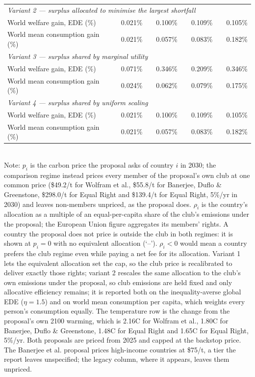 \begin{table}[htbp]
\begin{tabular}{lcccccccc}
  \midrule
  \multicolumn{9}{l}{\textit{Variant 2 --- surplus allocated to minimise the largest shortfall}} \\
  \quad World welfare gain, EDE (\%) &  & 0.021\% &  & 0.100\% &  & 0.109\% &  & 0.105\% \\
  \quad World mean consumption gain (\%) &  & 0.021\% &  & 0.057\% &  & 0.083\% &  & 0.182\% \\
  \midrule
  \multicolumn{9}{l}{\textit{Variant 3 --- surplus shared by marginal utility}} \\
  \quad World welfare gain, EDE (\%) &  & 0.071\% &  & 0.346\% &  & 0.209\% &  & 0.346\% \\
  \quad World mean consumption gain (\%) &  & 0.024\% &  & 0.062\% &  & 0.079\% &  & 0.175\% \\
  \midrule
  \multicolumn{9}{l}{\textit{Variant 4 --- surplus shared by uniform scaling}} \\
  \quad World welfare gain, EDE (\%) &  & 0.021\% &  & 0.100\% &  & 0.109\% &  & 0.105\% \\
  \quad World mean consumption gain (\%) &  & 0.021\% &  & 0.057\% &  & 0.083\% &  & 0.182\% \\
  \bottomrule
\end{tabular}
\label{tab:equiv_rights_A}
\\[4pt]
{\footnotesize Note: $p_i$ is the carbon price the proposal asks of country $i$ in 2030; the comparison regime instead prices every member of the proposal's own club at one common price (\$49.2/t for Wolfram et al., \$55.8/t for Banerjee, Duflo \& Greenstone, \$298.0/t for Equal Right and \$139.4/t for Equal Right, 5\%/yr in 2030) and leaves non-members unpriced, as the proposal does. $\rho_i$ is the country's allocation as a multiple of an equal-per-capita share of the club's emissions under the proposal; the European Union figure aggregates its members' rights. A country the proposal does not price is outside the club in both regimes: it is shown at $p_i=0$ with no equivalent allocation (`--'). $\rho_i < 0$ would mean a country prefers the club regime even while paying a net fee for its allocation. Variant 1 lets the equivalent allocation set the cap, so the club price is recalibrated to deliver exactly those rights; variant 2 rescales the same allocation to the club's own emissions under the proposal, so club emissions are held fixed and only allocative efficiency remains; it is reported both on the inequality-averse global EDE ($\eta=1.5$) and on world mean consumption per capita, which weights every person's consumption equally. The temperature row is the change from the proposal's own 2100 warming, which is 2.16\textdegree{}C for Wolfram et al., 1.80\textdegree{}C for Banerjee, Duflo \& Greenstone, 1.48\textdegree{}C for Equal Right and 1.65\textdegree{}C for Equal Right, 5\%/yr. Both proposals are priced from 2025 and capped at the backstop price. The Banerjee et al. proposal prices high-income countries at \$75/t, a tier the report leaves unspecified; the legacy column, where it appears, leaves them unpriced.}
\end{table}
